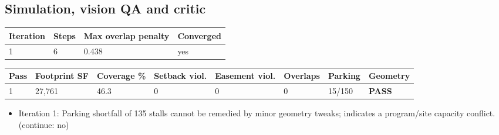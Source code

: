 \documentclass[10pt]{article}
\begin{document}
\subsection{Simulation, vision QA and critic}
{\small \begin{longtable}{p{2cm}p{2cm}p{3.5cm}p{2cm}}
\toprule
\textbf{Iteration} & \textbf{Steps} & \textbf{Max overlap penalty} & \textbf{Converged} \\ \midrule \endhead
1 & 6 & 0.438 & yes \\
\bottomrule
\end{longtable}}
{\small \begin{longtable}{p{0.9cm}p{1.8cm}p{1.6cm}p{1.6cm}p{1.8cm}p{1.4cm}p{1.6cm}p{1.5cm}}
\toprule
\textbf{Pass} & \textbf{Footprint SF} & \textbf{Coverage \%} & \textbf{Setback viol.} & \textbf{Easement viol.} & \textbf{Overlaps} & \textbf{Parking} & \textbf{Geometry} \\ \midrule \endhead
1 & 27,761 & 46.3 & 0 & 0 & 0 & 15/150 & \textcolor{pass}{\textbf{PASS}} \\
\bottomrule
\end{longtable}}
\begin{itemize}\item Iteration 1: Parking shortfall of 135 stalls cannot be remedied by minor geometry tweaks; indicates a program/site capacity conflict. (continue: no)\end{itemize}
\end{document}
